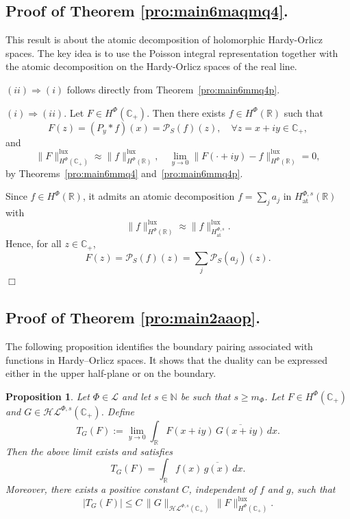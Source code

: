 \documentclass[a4paper,12pt,intlimits,oneside]{amsart}
\newtheorem{proposition}[theorem]{Proposition}
\theoremstyle{definition}
\numberwithin{equation}{section}
\newcommand{\epf}{ $\Box$\medskip}
\theoremstyle{definition}
\begin{document}
\subsection{Proof of Theorem \ref{pro:main6maqmq4}.} 

\medskip

\noindent
This result is about the atomic decomposition of holomorphic Hardy-Orlicz spaces. 
The key idea is to use the Poisson integral representation together with the atomic decomposition on the Hardy-Orlicz spaces of the real line.



\noindent $(ii) \Rightarrow (i)$ follows directly from Theorem~\ref{pro:main6mmq4p}.

\medskip

\noindent $(i) \Rightarrow (ii)$.
Let $F \in H^{\Phi}(\mathbb{C}_{+})$. Then there exists $f \in H^{\Phi}(\mathbb{R})$ such that
\[
F(z) = (P_y * f)(x) = \mathcal{P}_S(f)(z), \quad \forall z = x + iy \in \mathbb{C}_{+},
\]
and
\[
\|F\|_{H^{\Phi}(\mathbb{C}_{+})}^{\mathrm{lux}} \approx \|f\|_{H^{\Phi}(\mathbb{R})}^{\mathrm{lux}}, 
\quad 
\lim_{y \to 0} \|F(\cdot + iy) - f\|_{H^{\Phi}(\mathbb{R})}^{\mathrm{lux}} = 0,
\]
by Theorems~\ref{pro:main6mmq4} and~\ref{pro:main6mmq4p}.

Since $f \in H^{\Phi}(\mathbb{R})$, it admits an atomic decomposition $f = \sum_j a_j$ in $H^{\Phi,s}_{\mathrm{at}}(\mathbb{R})$ with
\[
\|f\|_{H^{\Phi}(\mathbb{R})}^{\mathrm{lux}} \approx \|f\|_{H^{\Phi,s}_{\mathrm{at}}}^{\mathrm{lux}}.
\]
Hence, for all $z \in \mathbb{C}_{+}$,
\[
F(z) = \mathcal{P}_S(f)(z) = \sum_{j} \mathcal{P}_S(a_j)(z).
\]
\epf



\subsection{Proof of Theorem \ref{pro:main2aaop}.} 

\medskip

\noindent
The following proposition identifies the boundary pairing associated with functions in Hardy--Orlicz spaces. 
It shows that the duality can be expressed either in the upper half-plane or on the boundary.


\begin{proposition}\label{pro:main2aaqaop}
Let $\Phi \in \mathscr{L}$ and let $s \in \mathbb{N}$ be such that $s \ge m_{\Phi}$. 
Let $F \in H^{\Phi}(\mathbb{C}_{+})$ and $G \in \mathcal{H}\mathcal{L}^{\Phi,s}(\mathbb{C}_{+})$. Define
\[
T_G(F) := \lim_{y \to 0} \int_{\mathbb{R}} F(x+iy)\,\overline{G(x+iy)}\,dx.
\]
Then the above limit exists and satisfies
\[
T_G(F) = \int_{\mathbb{R}} f(x)\,\overline{g(x)}\,dx.
\]
Moreover, there exists a positive constant $C$, independent of $f$ and $g$, such that
\begin{equation}\label{eq:ineitmlqpqqehay}
|T_G(F)| \le C\, \|G\|_{\mathcal{H}\mathcal{L}^{\Phi,s}(\mathbb{C}_{+})}\, \|F\|_{H^{\Phi}(\mathbb{C}_{+})}^{\mathrm{lux}}.
\end{equation}
\end{proposition}
\end{document}
